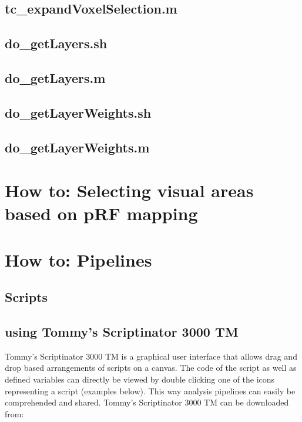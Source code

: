 \documentclass[12pt,a4paper]{scrartcl}
\begin{document}
\subsection{tc\_expandVoxelSelection.m}

\subsection{do\_getLayers.sh}
\label{sec:getLyr}

\subsection{do\_getLayers.m}

\subsection{do\_getLayerWeights.sh}
\label{sec:getLyrW}

\subsection{do\_getLayerWeights.m}

\section{How to: Selecting visual areas based on pRF mapping}
\label{sec:GUIprf}

\section{How to: Pipelines}
\label{sec:pipelines}
\subsection{Scripts}
\subsection{using Tommy's Scriptinator 3000 TM}
\label{sec:scriptinator}
Tommy's Scriptinator 3000 TM is a graphical user interface that allows drag and drop based arrangements of scripts on a canvas. The code of the script as well as defined variables can directly be viewed by double clicking one of the icons representing a script (examples below). This way analysis pipelines can easily be comprehended and shared. Tommy's Scriptinator 3000 TM can be downloaded from:\\
\end{document}
